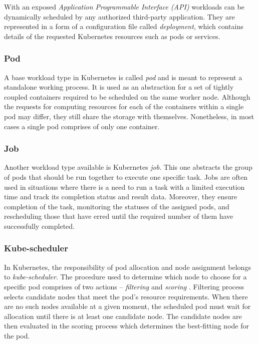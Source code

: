 With an exposed \emph{Application Programmable Interface (API)} workloads can be dynamically scheduled by any authorized third-party application.
They are represented in a form of a configuration file called \emph{deployment}, which contains details of the requested Kubernetes resources such as pods or services.




\subsubsection{Pod}\label{s:ProblemDomain:Kubernetes:pod}

A base workload type in Kubernetes is called \emph{pod} and is meant to represent a standalone working process. 
It is used as an abstraction for a set of tightly coupled containers required to be scheduled on the same worker node.
Although the requests for computing resources for each of the containers within a single pod may differ, they still share the storage with themselves.
Nonetheless, in most cases a single pod comprises of only one container.




\subsubsection{Job}\label{s:ProblemDomain:Kubernetes:job}

Another workload type available is Kubernetes \emph{job}.
This one abstracts the group of pods that should be run together to execute one specific task.
Jobs are often used in situations where there is a need to run a task with a limited execution time and track its completion status and result data.
Moreover, they ensure completion of the task, monitoring the statuses of the assigned pods, and rescheduling those that have erred until the required number of them have successfully completed.




\subsubsection{Kube-scheduler}\label{s:ProblemDomain:Kubernetes:scheduler}

In Kubernetes, the responsibility of pod allocation and node assignment belongs to \emph{kube-scheduler}.
The procedure used to determine which node to choose for a specific pod comprises of two actions -- \emph{filtering} and \emph{scoring} \cite{b:Kubernetes-scheduler}.
Filtering process selects candidate nodes that meet the pod's resource requirements.
When there are no such nodes available at a given moment, the scheduled pod must wait for allocation until there is at least one candidate node.
The candidate nodes are then evaluated in the scoring process which determines the best-fitting node for the pod.

